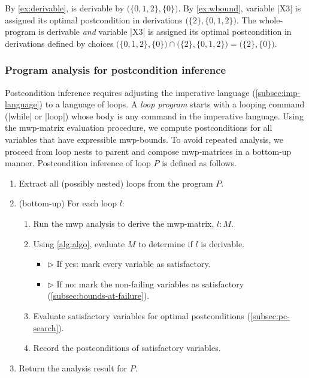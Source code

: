 \begin{example}\label{ex:opt-derivation}
By \autoref{ex:derivable}, \exname is derivable by  \(\big(\{0, 1, 2\}, \{0\}\big)\).
By \autoref{ex:wbound}, variable \pr|X3| is assigned its optimal postcondition in derivations \(\big(\{2\}, \{0,1,2\}\big)\).
The whole-program is derivable \emph{and} variable \pr|X3| is assigned its optimal postcondition in derivations defined by choices
\( \big(\{0, 1, 2\}, \{0\}\big) \cap \big(\{2\}, \{0,1,2\}\big) = \big( \{2\}, \{0\}\big) \).
\end{example}

\subsubsection{Program analysis for postcondition inference}
\label{subsec:inference}

Postcondition inference requires adjusting the imperative language (\autoref{subsec:imp-language}) to a language of loops.
A \emph{loop program} starts with a looping command (\pr|while| or \pr|loop|) whose body is any command in the imperative language.
Using the mwp-matrix evaluation procedure, we compute postconditions for all variables that have expressible mwp-bounds.
To avoid repeated analysis, we proceed from loop nests to parent and compose mwp-matrices in a bottom-up manner. %
Postcondition inference of loop \(P\) is defined as follows.

\begin{enumerate}
    \item Extract all (possibly nested) loops from the program \(P\).
    \item (bottom-up) For each loop \(l\):
    \begin{enumerate}[label=(\roman*)]
    \item Run the mwp analysis to derive the mwp-matrix, \(l : M\).
    \item Using \autoref{alg:algo}, evaluate \(M\) to determine if \(l\) is derivable.
    \begin{itemize}
        \item[] \(\triangleright\) If yes: mark every variable as satisfactory.
        \item[] \(\triangleright\) If no: mark the non-failing variables as satisfactory (\autoref{subsec:bounds-at-failure}).
    \end{itemize}
    \item Evaluate satisfactory variables for optimal postconditions (\autoref{subsec:pc-search}).
    \item Record the postconditions of satisfactory variables.
    \end{enumerate}
    \item Return the analysis result for \(P\).
\end{enumerate}


